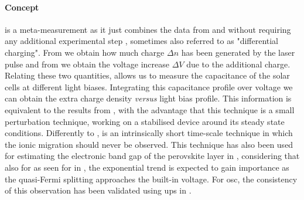 	\paragraph{Concept}
	 is a meta-measurement as it just combines the data from  and  without requiring any additional experimental step \cite{ORegan2005,ORegan2006,Shuttle2008,Credgington2014,Maurano2011}, sometimes also referred to as "differential charging".
	From  we obtain how much charge $\Delta n$ has been generated by the laser pulse and from  we obtain the voltage increase $\Delta V$ due to the additional charge.
	Relating these two quantities,  allows us to measure the capacitance of the solar cells at different light biases.
	Integrating this capacitance profile over voltage we can obtain the extra charge density \textsl{versus} light bias profile.
	This information is equivalent to the results from , with the advantage that this technique is a small perturbation technique, working on a stabilised device around its steady state conditions.
	Differently to ,  is an intrinsically short time\hyp{}scale technique in which the ionic migration should never be observed.
	This technique has also been used for estimating the electronic band gap of the perovskite layer in , considering that also for  as seen for  in , the exponential trend is expected to gain importance as the quasi-Fermi splitting approaches the built-in voltage.
	For \gls{osc}, the consistency of this observation has been validated using \gls{ups} in .



